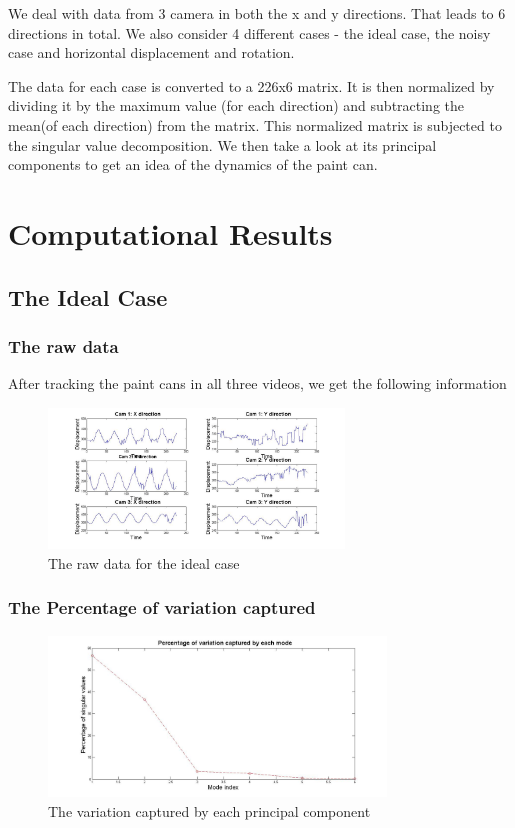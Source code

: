 \documentclass[a4paper]{article}
\begin{document}
We deal with data from 3 camera in both the x and y directions. That leads to 6 directions in total. We also consider 4 different cases - the ideal case, the noisy case and horizontal displacement and rotation.


The data for each case is converted to a 226x6 matrix. It is then normalized by dividing it by the maximum value (for each direction) and subtracting the mean(of each direction) from the matrix. This normalized matrix is subjected to the singular value decomposition. We then take a look at its principal components to get an idea of the dynamics of the paint can.




\section{Computational Results}

\subsection{The Ideal Case}

\subsubsection{The raw data}
After tracking the paint cans in all three videos, we get the following information

\begin{figure}[H] 
	\centering
	\includegraphics[width=0.7\textwidth]{rawdata.jpg}
	\caption{The raw data for the ideal case}	
\end{figure}


\subsubsection{The Percentage of variation captured}
\begin{figure}[h!] 
\centering
	\includegraphics[width=0.8\textwidth]{percent1.jpg}
	\caption{The variation captured by each principal component}
\end{figure}
\end{document}
